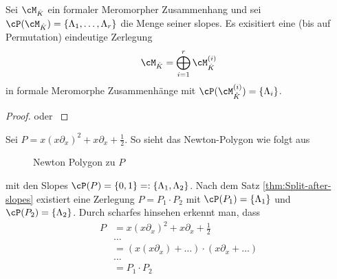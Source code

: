 \begin{thm} \label{thm:Split-after-slopes}
\cite[Thm 5.3.1]{sabbah_cimpa90} \cite[5.15]{ZulaBarbara}
Sei $\cM_{\hat{K}}$ ein formaler Meromorpher Zusammenhang und sei
$\cP(\cM_{\hat K})=\{\Lambda_1,\dots,\Lambda_r\}$ die Menge seiner
slopes. Es exisitiert eine (bis auf Permutation) eindeutige Zerlegung
\[
\cM_{\hat K}=\bigoplus_{i=1}^r\cM_{\hat K}^{(i)}
\]
in formale Meromorphe Zusammenhänge
mit $\cP(\cM_{\hat K}^{(i)})=\{\Lambda_i\}$.
\end{thm}
\begin{proof}
\cite[Thm 5.3.1]{sabbah_cimpa90} oder \cite[5.15]{ZulaBarbara}
\end{proof}
\begin{exmp}
\cite[Ex 5.3.6]{sabbah_cimpa90}
Sei $P=x(x\partial_x)^2+x\partial_x+\frac{1}{2}$. So sieht das Newton-Polygon
wie folgt aus
\begin{figure}[H]
\caption{Newton Polygon zu $P$}
\begin{center}
\end{center}
\end{figure}
mit den Slopes $\cP(P)=\{0,1\}=:\{\Lambda_1,\Lambda_2\}$. Nach dem Satz
\ref{thm:Split-after-slopes} existiert eine Zerlegung $P=P_1\cdot P_2$ mit
$\cP(P_1)=\{\Lambda_1\}$ und $\cP(P_2)=\{\Lambda_2\}$. Durch scharfes hinsehen
erkennt man, dass
\begin{align*}
P &= x(x\partial_x)^2+x\partial_x+\frac{1}{2}\\
  &\dots\\
  &= (x(x\partial_x)+\dots)\cdot(x\partial_x+\dots)\\
  &\dots\\
  &= P_1\cdot P_2
\end{align*}
\begin{comment}

\end{comment}
\end{exmp}
